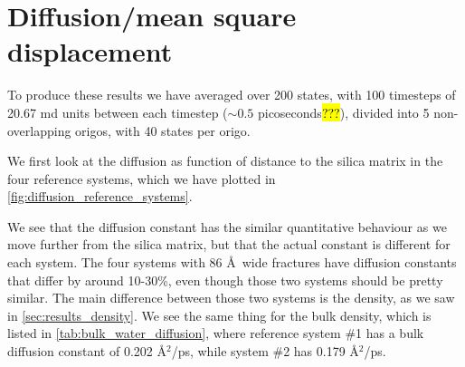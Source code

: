 \section{Diffusion/mean square displacement}




To produce these results we have averaged over 200 states, with 100 timesteps of 20.67 md units between each timestep ($\sim 0.5$ picoseconds\hl{???}), divided into 5 non-overlapping origos, with 40 states per origo.

We first look at the diffusion as function of distance to the silica matrix in the four reference systems, which we have plotted in \cref{fig:diffusion_reference_systems}. 
%

We see that the diffusion constant has the similar quantitative behaviour as we move further from the silica matrix, but that the actual constant is different for each system. The four systems with 86 \AA\ wide fractures have diffusion constants that differ by around 10-30\%, even though those two systems should be pretty similar. The main difference between those two systems is the density, as we saw in \cref{sec:results_density}. We see the same thing for the bulk density, which is listed in \cref{tab:bulk_water_diffusion}, where reference system \#1 has a bulk diffusion constant of {0.202 \AA$^2$/ps}, while system \#2 has {0.179 \AA$^2$/ps}.

